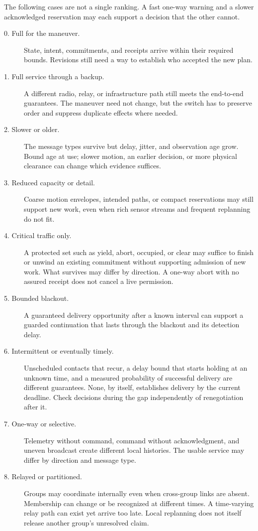 \documentclass[11pt]{article}
\begin{document}
The following cases are not a single ranking. A fast one-way warning and a slower acknowledged reservation may each support a decision that the other cannot.
\begin{description}
\item[0. Full for the maneuver.] State, intent, commitments, and receipts arrive within their required bounds. Revisions still need a way to establish who accepted the new plan.
\item[1. Full service through a backup.] A different radio, relay, or infrastructure path still meets the end-to-end guarantees. The maneuver need not change, but the switch has to preserve order and suppress duplicate effects where needed.
\item[2. Slower or older.] The message types survive but delay, jitter, and observation age grow. Bound age at use; slower motion, an earlier decision, or more physical clearance can change which evidence suffices.
\item[3. Reduced capacity or detail.] Coarse motion envelopes, intended paths, or compact reservations may still support new work, even when rich sensor streams and frequent replanning do not fit.
\item[4. Critical traffic only.] A protected set such as yield, abort, occupied, or clear may suffice to finish or unwind an existing commitment without supporting admission of new work. What survives may differ by direction. A one-way abort with no assured receipt does not cancel a live permission.
\item[5. Bounded blackout.] A guaranteed delivery opportunity after a known interval can support a guarded continuation that lasts through the blackout and its detection delay.
\item[6. Intermittent or eventually timely.] Unscheduled contacts that recur, a delay bound that starts holding at an unknown time, and a measured probability of successful delivery are different guarantees. None, by itself, establishes delivery by the current deadline. Check decisions during the gap independently of renegotiation after it.
\item[7. One-way or selective.] Telemetry without command, command without acknowledgment, and uneven broadcast create different local histories. The usable service may differ by direction and message type.
\item[8. Relayed or partitioned.] Groups may coordinate internally even when cross-group links are absent. Membership can change or be recognized at different times. A time-varying relay path can exist yet arrive too late. Local replanning does not itself release another group's unresolved claim.

\end{description}
\end{document}
